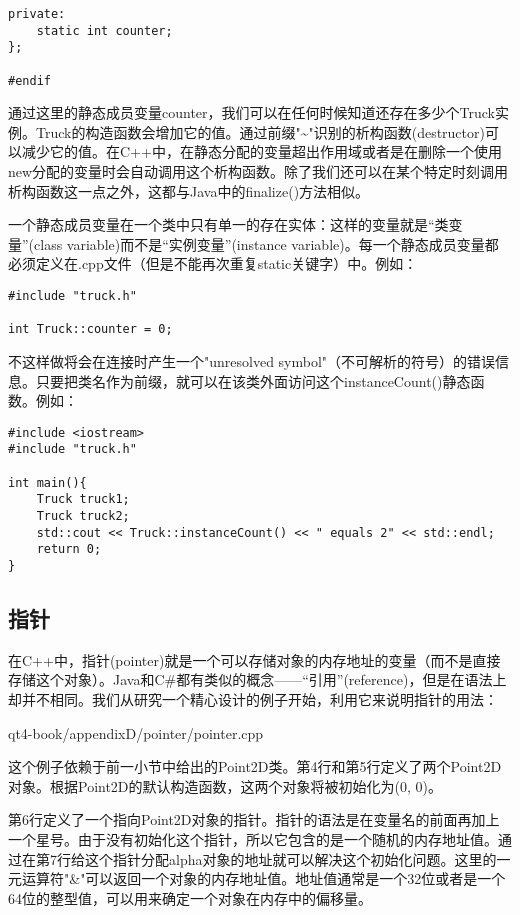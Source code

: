\documentclass[11pt,oneside]{book}
\begin{document}
\begin{common-format}
\begin{Verbatim}
private:
    static int counter;
};

#endif
\end{Verbatim}

通过这里的静态成员变量counter，我们可以在任何时候知道还存在多少个Truck实例。Truck的构造函数会增加它的值。通过前缀"\~{}"识别的析构函数(destructor)可以减少它的值。在C++中，在静态分配的变量超出作用域或者是在删除一个使用new分配的变量时会自动调用这个析构函数。除了我们还可以在某个特定时刻调用析构函数这一点之外，这都与Java中的finalize()方法相似。

一个静态成员变量在一个类中只有单一的存在实体：这样的变量就是“类变量”(class variable)而不是“实例变量”(instance variable)。每一个静态成员变量都必须定义在.cpp文件（但是不能再次重复static关键字）中。例如：
\begin{Verbatim}
#include "truck.h"

int Truck::counter = 0;
\end{Verbatim}

不这样做将会在连接时产生一个"unresolved symbol"（不可解析的符号）的错误信息。只要把类名作为前缀，就可以在该类外面访问这个instanceCount()静态函数。例如：
\begin{Verbatim}
#include <iostream>
#include "truck.h"

int main(){
    Truck truck1;
    Truck truck2;
    std::cout << Truck::instanceCount() << " equals 2" << std::endl;
    return 0;
}
\end{Verbatim}



\subsection{指针}
在C++中，指针(pointer)就是一个可以存储对象的内存地址的变量（而不是直接存储这个对象）。Java和C\#{}都有类似的概念——“引用”(reference)，但是在语法上却并不相同。我们从研究一个精心设计的例子开始，利用它来说明指针的用法：

\begin{cppinput}{qt4-book/appendixD/pointer/pointer.cpp}
\end{cppinput}

这个例子依赖于前一小节中给出的Point2D类。第4行和第5行定义了两个Point2D对象。根据Point2D的默认构造函数，这两个对象将被初始化为(0, 0)。

第6行定义了一个指向Point2D对象的指针。指针的语法是在变量名的前面再加上一个星号。由于没有初始化这个指针，所以它包含的是一个随机的内存地址值。通过在第7行给这个指针分配alpha对象的地址就可以解决这个初始化问题。这里的一元运算符"\&{}"可以返回一个对象的内存地址值。地址值通常是一个32位或者是一个64位的整型值，可以用来确定一个对象在内存中的偏移量。 


\end{common-format}
\end{document}
